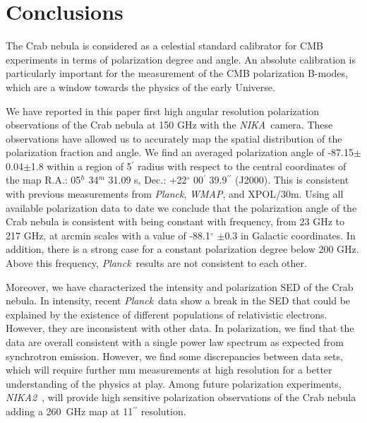 \documentclass[twocolumn,traditabstract]{aa}
\def\NIKA{\textit{NIKA}}
\def\NIKAd{\textit{NIKA2}}
\def\Planck{\textit{Planck}}
\def\WMAP{\textit{WMAP}}
\begin{document}


\section{Conclusions}\label{sec:conclusions}
The Crab nebula is considered as a celestial standard calibrator for CMB experiments in
terms of polarization degree and angle. An absolute calibration is
particularly important for the measurement of the CMB polarization B-modes,
which are a window towards the physics of the early Universe.

We have reported in this paper first high angular resolution polarization observations
of the Crab nebula at 150 GHz with the \NIKA\ camera. These observations have
allowed us to accurately map the spatial distribution of the polarization
fraction and angle.  We find an averaged polarization angle of
-87.15$\pm$0.04$\pm$1.8 within a region of 5$^\prime$ radius with respect to the
central coordinates of the map R.A.: 05$^{h}$ 34$^{m}$ 31.09 s, Dec.:
+22$^{\circ}$ 00$^{\prime}$ 39.9$^{\prime\prime}$ (J2000).  This is consistent with
previous measurements from \Planck, \WMAP, and XPOL/30m.
Using all available polarization data to date we conclude that the
polarization angle of the Crab nebula is consistent with being constant with
frequency, from 23 GHz to 217 GHz, at arcmin scales with a value of
-88.1$^{\circ}$ $\pm$0.3 in Galactic coordinates.
In addition, there is a strong case for a constant polarization degree below 200 GHz. Above this frequency, \Planck\ results are not consistent to each other. 

Moreover, we have characterized the intensity and polarization SED of the Crab nebula. In intensity, recent \Planck\ data show a break in the SED that could be explained by the existence of different populations of relativistic electrons. However, they are inconsistent with other data. In polarization, we find that the data are overall consistent with a single power law spectrum as expected from synchrotron emission. However, we find some discrepancies between data sets, which will require further mm measurements at high resolution for a better understanding of the physics at play. Among future polarization experiments, \NIKAd\ \citep{calvo2016}, will provide high sensitive polarization observations of the Crab nebula adding a 260~GHz map at 11$^{\prime\prime}$ resolution.
\end{document}

